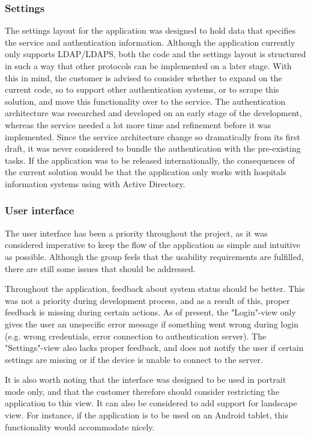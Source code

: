 \subsubsection{Settings}
The settings layout for the application was designed to hold data that specifies the service and authentication information. Although the application currently only supports LDAP/LDAPS, both the code and the settings layout is structured in such a way that other protocols can be implemented on a later stage. With this in mind, the customer is advised to consider whether to expand on the current code, so to support other authentication systems, or to scrape this solution, and move this functionality over to the service. The authentication architecture was researched and developed on an early stage of the development, whereas the service needed a lot more time and refinement before it was implemented. Since the service architecture change so dramatically from its first draft, it was never considered to bundle the authentication with the pre-existing tasks. If the application was to be released internationally, the consequences of the current solution would be that the application only works with hospitals information systems using with Active Directory. 


\subsubsection{User interface}
The user interface has been a priority throughout the project, as it was considered imperative to keep the flow of the application as simple and intuitive as possible. Although the group feels that the usability requirements are fulfilled, there are still some issues that should be addressed.

Throughout the application, feedback about system status should be better. This was not a priority during development process, and as a result of this, proper feedback is missing during certain actions. As of present, the "Login"-view only gives the user an unspecific error message if something went wrong during login (e.g. wrong credentials, error connection to authentication server). The "Settings"-view also lacks proper feedback, and does not notify the user if certain settings are missing or if the device is unable to connect to the server.

It is also worth noting that the interface was designed to be used in portrait mode only, and that the customer therefore should consider restricting the application to this view. It can also be considered to add support for landscape view. For instance, if the application is to be used on an Android tablet, this functionality would accommodate nicely.


